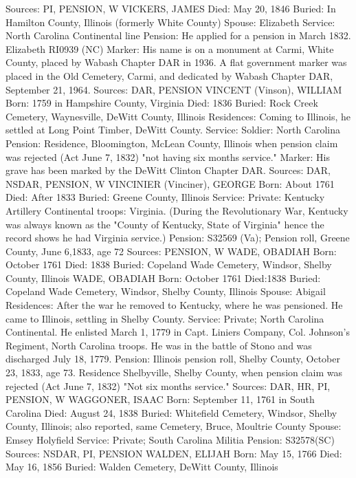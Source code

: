 Sources: PI, PENSION, W 
VICKERS, JAMES 
Died: May 20, 1846 
Buried: In Hamilton County, Illinois (formerly White County) 
Spouse: Elizabeth Service: North Carolina Continental line 
Pension: He applied for a pension in March 1832. Elizabeth RI0939 (NC) 
Marker: His name is on a monument at Carmi, White County, placed by Wa­bash Chapter DAR in 1936.  A flat government marker was placed in the Old Cemetery, Carmi, and dedicated by Wabash Chapter DAR, September 21, 1964. 
Sources: DAR, PENSION 
VINCENT (Vinson), WILLIAM 
Born: 1759 in Hampshire County, Virginia 
Died: 1836 
Buried: Rock Creek Cemetery, Waynesville, DeWitt County, Illinois 
Residences: Coming to Illinois, he settled at Long Point Timber, DeWitt County. 
Service: Soldier: North Carolina Pension: Residence, Bloomington, McLean County, Illinois when pension claim was rejected (Act June 7, 1832) "not having six months service." 
Marker: His grave has been marked by the DeWitt Clinton Chapter DAR. 
Sources: DAR, NSDAR, PENSION, W 
VINCINIER (Vinciner), GEORGE 
Born: About 1761 
Died: After 1833 Buried: Greene County, Illinois 
Service: Private: Kentucky Artillery Continental troops: Virginia. (During the Revolutionary War, Kentucky was always known as the "County of Kentucky, State of Virginia" hence the record shows he had Virginia service.) 
Pension: S32569 (Va); Pension roll, Greene County, June 6,1833, age 72 
Sources: PENSION, W 
WADE, OBADIAH 
Born: October 1761 
Died: 1838 
Buried: Copeland Wade Cemetery, Windsor, Shelby County, Illinois
WADE, OBADIAH 
Born: October 1761 
Died:1838 
Buried: Copeland Wade Cemetery, Windsor, Shelby County, Illinois 
Spouse: Abigail Residences: After the war he removed to Kentucky, where he was pensioned. He came to Illinois, settling in Shelby County.
Service: Private; North Carolina Continental. He enlisted March 1, 1779 in Capt. Liniers Company, Col. Johnson's Regiment, North Carolina troops. He was in the battle of Stono and was discharged July 18, 1779. 
Pension: Illinois pension roll, Shelby County, October 23, 1833, age 73. Residence Shelbyville, Shelby County, when pension claim was rejected (Act June 7, 1832) "Not six months service." 
Sources: DAR, HR, PI, PENSION, W 
WAGGONER, ISAAC 
Born: September 11, 1761 in South Carolina 
Died: August 24, 1838 
Buried: Whitefield Cemetery, Windsor, Shelby County, Illinois; also reported, same Cemetery, Bruce, Moultrie County 
Spouse: Emsey Holyfield
Service: Private; South Carolina Militia Pension: S32578(SC) 
Sources: NSDAR, PI, PENSION 
WALDEN, ELIJAH 
Born: May 15, 1766 
Died: May 16, 1856 
Buried: Walden Cemetery, DeWitt County, Illinois 
